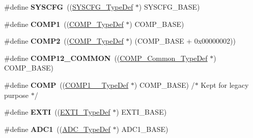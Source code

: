 \begin{DoxyCompactItemize}
\item 
\mbox{\label{group___peripheral__declaration_ga3c833fe1c486cb62250ccbca32899cb8}} 
\#define {\bfseries S\+Y\+S\+C\+FG}~((\hyperlink{struct_s_y_s_c_f_g___type_def}{S\+Y\+S\+C\+F\+G\+\_\+\+Type\+Def} $\ast$) S\+Y\+S\+C\+F\+G\+\_\+\+B\+A\+SE)
\item 
\mbox{\label{group___peripheral__declaration_gaf5713f83009027d48805b049d55bb01b}} 
\#define {\bfseries C\+O\+M\+P1}~((\hyperlink{struct_c_o_m_p___type_def}{C\+O\+M\+P\+\_\+\+Type\+Def} $\ast$) C\+O\+M\+P\+\_\+\+B\+A\+SE)
\item 
\mbox{\label{group___peripheral__declaration_ga6985fa7e9bb3c2edf15b29b7af210a2b}} 
\#define {\bfseries C\+O\+M\+P2}~((\hyperlink{struct_c_o_m_p___type_def}{C\+O\+M\+P\+\_\+\+Type\+Def} $\ast$) (C\+O\+M\+P\+\_\+\+B\+A\+SE + 0x00000002))
\item 
\mbox{\label{group___peripheral__declaration_ga7c0dbc759386dc94597d1ab7b798e75f}} 
\#define {\bfseries C\+O\+M\+P12\+\_\+\+C\+O\+M\+M\+ON}~((\hyperlink{struct_c_o_m_p___common___type_def}{C\+O\+M\+P\+\_\+\+Common\+\_\+\+Type\+Def} $\ast$) C\+O\+M\+P\+\_\+\+B\+A\+SE)
\item 
\mbox{\label{group___peripheral__declaration_ga076912543697dbe4c46b79e8e44ad2fb}} 
\#define {\bfseries C\+O\+MP}~((\hyperlink{struct_c_o_m_p1__2___type_def}{C\+O\+M\+P1\+\_\+\_\+\+Type\+Def} $\ast$) C\+O\+M\+P\+\_\+\+B\+A\+SE) /$\ast$ Kept for legacy purpose $\ast$/
\item 
\mbox{\label{group___peripheral__declaration_ga9189e770cd9b63dadd36683eb9843cac}} 
\#define {\bfseries E\+X\+TI}~((\hyperlink{struct_e_x_t_i___type_def}{E\+X\+T\+I\+\_\+\+Type\+Def} $\ast$) E\+X\+T\+I\+\_\+\+B\+A\+SE)
\item 
\mbox{\label{group___peripheral__declaration_ga90d2d5c526ce5c0a551f533eccbee71a}} 
\#define {\bfseries A\+D\+C1}~((\hyperlink{struct_a_d_c___type_def}{A\+D\+C\+\_\+\+Type\+Def} $\ast$) A\+D\+C1\+\_\+\+B\+A\+SE)
\item 
\mbox{\label{group___peripheral__declaration_gaf1919c64fc774aab31190346fd5457e2}} 

\end{DoxyCompactItemize}
